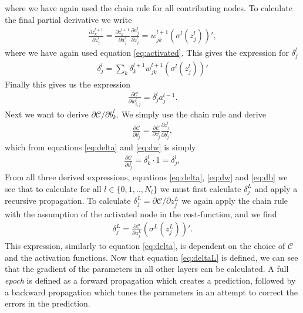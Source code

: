 where we have again used the chain rule for all contributing nodes. To calculate the final partial derivative we write
\begin{align*}
    \frac{\partial z_k^{l+1}}{\partial z^l_j} = \frac{\partial z_k^{l+1}}{\partial a^l_j}\frac{\partial a^l_j}{\partial z^l_j}
                                              = w_{jk}^{l+1}(\sigma^l(z_j^l))',
\end{align*}
where we have again used equation \ref{eq:activated}. This gives the expression for $\delta_j^l$
\begin{align}\label{eq:delta}
    \delta_j^l  = \sum_k \delta_k^{l+1}w_{jk}^{l+1}(\sigma^l(z_j^l))'  
\end{align}
Finally this gives us the expression
\begin{align}\label{eq:dw}
    \frac{\partial \mathcal{C}}{\partial w_{i,j}^l} = \delta_j^{l} a_j^{l-1}.
\end{align}
Next we want to derive $\partial \mathcal{C}/\partial b^l_k$. We simply use the chain rule and derive
\begin{align*}
    \frac{\partial \mathcal{C}}{\partial b^l_j} = \frac{\partial \mathcal{C}}{\partial z^l_j}\frac{\partial z_j^l}{\partial b^l_j},
\end{align*}
which from equations \ref{eq:delta} and \ref{eq:dw} is simply
\begin{align}\label{eq:db}
    \frac{\partial \mathcal{C}}{\partial b^l_j} = \delta_k^{l} \cdot 1 = \delta_j^{l},
\end{align}
From all three derived expressions, equations \ref{eq:delta}, \ref{eq:dw} and \ref{eq:db} we see that 
to calculate for all $l\in\{0,1,..,N_l\}$ we must first calculate $\delta_j^L$ and apply a recursive propagation.
To calculate $\delta_j^L = \partial \mathcal{C}/\partial z^L_j$ we again apply the chain rule with the assumption of the activated 
node in the cost-function, and we find
\begin{align}\label{eq:deltaL}
    \delta_j^L = \frac{\partial \mathcal{C}}{\partial a^L_j}\left(\sigma^L(z_j^L)\right)'.
\end{align}
This expression, similarly to equation \ref{eq:delta}, is dependent on the choice of $\mathcal{C}$ and 
the activation functions. Now that equation \ref{eq:deltaL} is defined, we can see that the
gradient of the parameters in all other layers can be calculated. A full \emph{epoch} is defined as 
a forward propagation which creates a prediction, followed by a backward propagation which tunes the parameters 
in an attempt to correct the errors in the prediction.
